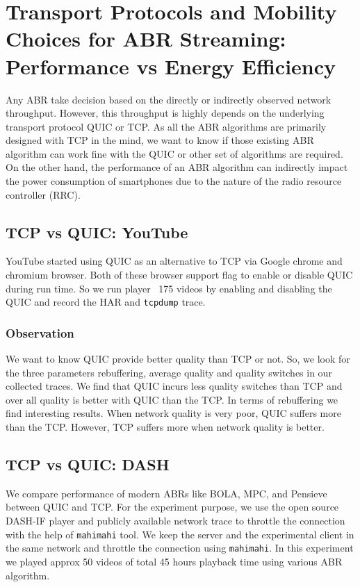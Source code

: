 \section{Transport Protocols and Mobility Choices for ABR Streaming: Performance vs Energy Efficiency}
Any ABR take decision based on the directly or indirectly observed network throughput. However, this throughput is highly depends on the underlying transport protocol QUIC or TCP. As all the ABR algorithms are primarily designed with TCP in the mind, we want to know if those existing ABR algorithm can work fine with the QUIC or other set of algorithms are required. On the other hand, the performance of an ABR algorithm can indirectly impact the power consumption of smartphones due to the nature of the radio resource controller (RRC).

\subsection{TCP vs QUIC: YouTube}
YouTube started using QUIC as an alternative to TCP via Google chrome and chromium browser. Both of these browser support flag to enable or disable QUIC during run time. So we run player ~175 videos by enabling and disabling the QUIC and record the HAR and {\tt tcpdump} trace. 
\subsubsection{Observation}
We want to know QUIC provide better quality than TCP or not. So, we look for the three parameters rebuffering, average quality and quality switches in our collected traces. We find that QUIC incurs less quality switches than TCP and over all quality is better with QUIC than the TCP. In terms of rebuffering we find interesting results. When network quality is very poor, QUIC suffers more than the TCP. However, TCP suffers more when network quality is better.

\subsection{TCP vs QUIC: DASH}
We compare performance of modern ABRs like BOLA, MPC, and Pensieve between QUIC and TCP. For the experiment purpose, we use the open source DASH-IF player and publicly available network trace to throttle the connection with the help of {\tt mahimahi} tool. We keep the server and the experimental client in the same network and throttle the connection using {\tt mahimahi}. In this experiment we played approx 50 videos of total 45 hours playback time using various ABR algorithm.

